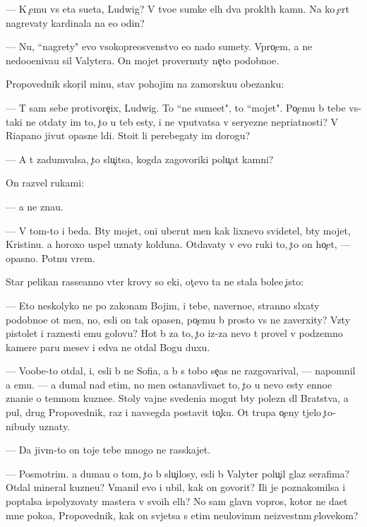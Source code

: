 \documentclass[10pt]{book}
\begin{document}
— K {\c}emu vs{\ia} eta su{\y}eta, Ludwig? V tvo{\y}e{\y} sumke {\q}el{\yi}h dva prokl{\ia}t{\yi}h kamn{\ia}. Na ko{\y} {\c}ert nagrevaty kardinala na {\y}e{\x}o odin?

— Nu, ``nagrety" {\y}evo v{\yi}sokopreosv{\ia}{\x}enstvo {\y}e{\x}o nado sumety. Vpro{\c}em, {\y}a ne nedoo{\q}eniva{\y}u sil{\yi} Valytera. On mojet provernuty ne{\c}to podobno{\y}e.

Propovednik skor{\c}il minu, stav pohojim na zamorsku{\y}u obez{\y}anku:

— T{\yi} sam sebe protivore{\c}ix, Ludwig. To ``ne sume{\y}et", to ``mojet". Po{\c}emu b{\yi} tebe vs{\e}-taki ne otdaty im to, {\c}to u teb{\ia} {\y}esty, i ne vput{\yi}vatsa v seryezn{\yi}{\y}e nepri{\y}atnosti? V Riapano jivut opasn{\yi}{\y}e l{\iu}di. Sto{\y}it li perebegaty im dorogu?

— A t{\yi} zadum{\yi}valsa, {\c}to slu{\c}itsa, kogda zagovor{\x}iki polu{\c}at kamni?

On razvel rukami:

— {\Y}a ne zna{\y}u.

— V tom-to i beda. B{\yi}ty mojet, oni uberut men{\ia} kak lixnevo svidetel{\ia}, b{\yi}ty mojet, Kristinu. {\Y}a horoxo uspel uznaty kolduna. Otdavaty v {\y}evo ruki to, {\c}to on ho{\c}et, — opasno. Pot{\ia}nu vrem{\ia}.

Star{\yi}{\y} pelikan rasse{\y}anno v{\yi}ter krovy so {\x}eki, ot{\c}evo ta ne stala bole{\y}e {\c}isto{\y}:

— Eto neskolyko ne po zakonam Boj{\yf}im, i tebe, naverno{\y}e, stranno sl{\yi}xaty podobno{\y}e ot men{\ia}, no, {\y}esli on tak opasen, po{\c}emu b{\yi} prosto vs{\e} ne zaverxity? Vz{\ia}ty pistolet i raznesti {\y}emu golovu? Hot{\ia} b{\yi} za to, {\c}to iz-za nevo t{\yi} provel v podzemno{\y} kamere paru mes{\ia}{\q}ev i {\y}edva ne otdal Bogu duxu.

— Voob{\x}e-to otdal, i, {\y}esli b{\yi} ne Sofi{\y}a, {\y}a b{\yi} s tobo{\y} se{\y}{\c}as ne razgovarival, — napomnil {\y}a {\y}emu. — {\Y}a dumal nad etim, no men{\ia} ostanavliva{\y}et to, {\c}to u nevo {\y}esty {\q}enno{\y}e znani{\y}e o temnom kuzne{\q}e. Stoly vajn{\yi}{\y}e svedeni{\y}a mogut b{\yi}ty polezn{\yi} dl{\ia} Bratstva, a pul{\ia}, drug Propovednik, raz i navsegda postavit to{\c}ku. Ot trupa o{\c}eny t{\ia}jelo {\c}to-nibudy uznaty.

— Da jiv{\yi}m-to on toje tebe mnogo ne rasskajet.

— Posmotrim. {\Y}a duma{\y}u o tom, {\c}to b{\yi} slu{\c}ilosy, {\y}esli b{\yi} Valyter polu{\c}il glaz serafima? Otdal mineral kuzne{\q}u? V{\yi}manil {\y}evo i ubil, kak on govorit? Ili je poznakomilsa i pop{\yi}talsa ispolyzovaty mastera v svo{\y}ih {\q}el{\ia}h? No sam{\yi}{\y} glavn{\yi}{\y} vopros, kotor{\yi}{\y} ne da{\y}et mne poko{\y}a, Propovednik, kak on sv{\ia}jetsa s etim neulovim{\yi}m ne{\y}izvestn{\yi}m {\c}elovekom?
\end{document}
